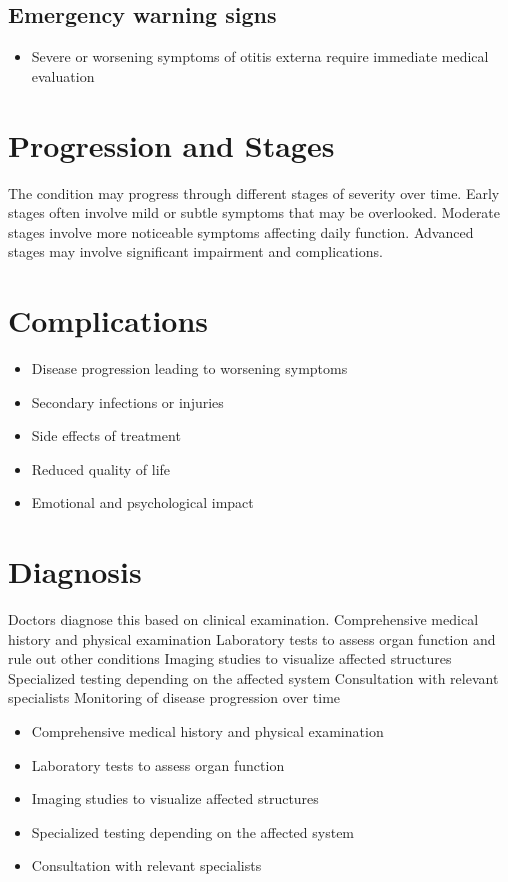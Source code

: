 \subsection{Emergency warning signs}
\begin{itemize}[noitemsep]
  \item Severe or worsening symptoms of otitis externa require immediate medical evaluation
\end{itemize}
\section{Progression and Stages}
The condition may progress through different stages of severity over time. Early stages often involve mild or subtle symptoms that may be overlooked. Moderate stages involve more noticeable symptoms affecting daily function. Advanced stages may involve significant impairment and complications.
\section{Complications}
\begin{itemize}[noitemsep]
  \item Disease progression leading to worsening symptoms
  \item Secondary infections or injuries
  \item Side effects of treatment
  \item Reduced quality of life
  \item Emotional and psychological impact
\end{itemize}
\section{Diagnosis}
Doctors diagnose this based on clinical examination. Comprehensive medical history and physical examination Laboratory tests to assess organ function and rule out other conditions Imaging studies to visualize affected structures Specialized testing depending on the affected system Consultation with relevant specialists Monitoring of disease progression over time

\begin{itemize}[noitemsep]
  \item Comprehensive medical history and physical examination
  \item Laboratory tests to assess organ function
  \item Imaging studies to visualize affected structures
  \item Specialized testing depending on the affected system
  \item Consultation with relevant specialists
\end{itemize}
